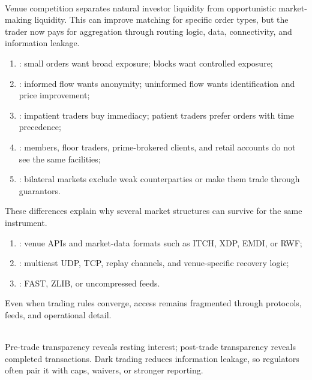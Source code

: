 \begin{caveat} \\
Venue competition separates natural investor liquidity from opportunistic market-making liquidity. This can improve matching for specific order types, but the trader now pays for aggregation through routing logic, data, connectivity, and information leakage.
\end{caveat}

\begin{taxonomy} 
\begin{enumerate}[label=\roman*.]
\setlength{\itemsep}{0pt}
\item {}: small orders want broad exposure; blocks want controlled exposure;
\item {}: informed flow wants anonymity; uninformed flow wants identification and price improvement;
\item {}: impatient traders buy immediacy; patient traders prefer orders with time precedence;
\item {}: members, floor traders, prime-brokered clients, and retail accounts do not see the same facilities;
\item {}: bilateral markets exclude weak counterparties or make them trade through guarantors.
\end{enumerate}
These differences explain why several market structures can survive for the same instrument.
\end{taxonomy}

\begin{taxonomy} 
\begin{enumerate}[label=\roman*.]
\setlength{\itemsep}{0pt}
\item {}: venue APIs and market-data formats such as ITCH, XDP, EMDI, or RWF;
\item {}: multicast UDP, TCP, replay channels, and venue-specific recovery logic;
\item {}: FAST, ZLIB, or uncompressed feeds.
\end{enumerate}
Even when trading rules converge, access remains fragmented through protocols, feeds, and operational detail.
\end{taxonomy}

\begin{marketrule} \\
Pre-trade transparency reveals resting interest; post-trade transparency reveals completed transactions. Dark trading reduces information leakage, so regulators often pair it with caps, waivers, or stronger reporting.
\end{marketrule}

